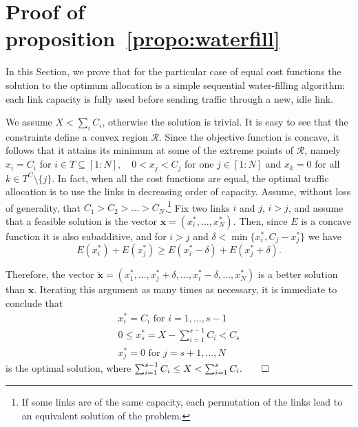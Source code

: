 \documentclass[journal,english,twocolumn,10pt,letterpaper]{IEEEtran}
\newcommand{\added}[1]{{#1}}
\begin{document}
\appendices

\section{Proof of proposition~\ref{propo:waterfill}}
\label{sec:proof}

In this Section, we prove that for the particular case of equal cost functions
the solution to the optimum allocation is a simple sequential water-filling
algorithm: each link capacity is fully used before sending traffic through a
new, idle link. 

We assume $X < \sum_i C_i$, otherwise the solution is trivial. It is easy to
see that the constraints define a convex region $\mathcal{R}$. Since the
objective function is concave, it follows that it attains its minimum at some
of the extreme points of $\mathcal{R}$, namely $x_i=C_i$ for $i\in T \subseteq
[1:N],\quad 0 < x_j < C_j$ for one $j \in [1:N]$ and $x_k=0$ for all $k \in
T^C\setminus \{j\}$. In fact, when all the cost functions are equal, the
optimal traffic allocation is to use the links in decreasing order of
capacity. Assume, without loss of generality, that
$C_1>C_2>\ldots>C_N$.\footnote{If some links are of the same capacity, each
  permutation of the links lead to an equivalent solution of the problem.} Fix
two links $i$ and $j$, $i>j$, and assume that a feasible solution is the
vector $\mathbf{x}=(x_i^*,\ldots,x_N^*)$. Then, since $E$ is a concave
function it is also subadditive, and for $i>j$ and $\delta < \min\{x_i^*,
C_j-x_j^*\}$ we have
\begin{equation}
  \label{eq:proof-subadditive}
  E(x_i^*) + E(x_j^*) \ge E(x_i^*-\delta) + E(x_j^* + \delta).
\end{equation}

Therefore, the vector $\tilde{\mathbf{x}} = (x_1^*, \ldots, x_j^*+\delta,
\ldots, x_i^*-\delta, \ldots, x_N^*)$ is a better solution tha\added{n} $\mathbf{x}$.
Iterating this argument as many times as necessary, it is immediate to
conclude that
\begin{align}
  \label{eq:proof-results}
  x_i^*=C_i  \text{ for } i=1, \ldots, s-1\\
  0 \le x_s^*=X-\sum_{i=1}^{s-1}C_i<C_s\\
  x_j^* = 0 \text{ for } j=s+1, \ldots, N
\end{align}
is the optimal solution, where $\sum_{i=1}^{s-1}C_i \le X <
\sum_{i=1}^sC_i.\qed$
\end{document}
